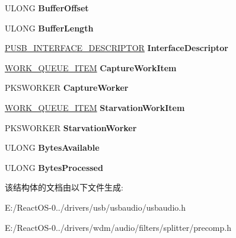 \begin{DoxyCompactItemize}
\item 
\mbox{\label{struct_p_i_n___c_o_n_t_e_x_t_a1b692865c2a3ac67ae30cae76ea9e280}} 
U\+L\+O\+NG {\bfseries Buffer\+Offset}
\item 
\mbox{\label{struct_p_i_n___c_o_n_t_e_x_t_a5e3c1354a0704eee10c434d832e787de}} 
U\+L\+O\+NG {\bfseries Buffer\+Length}
\item 
\mbox{\label{struct_p_i_n___c_o_n_t_e_x_t_ab3276f43d98ac39fb34ae56777789740}} 
\hyperlink{struct___u_s_b___i_n_t_e_r_f_a_c_e___d_e_s_c_r_i_p_t_o_r}{P\+U\+S\+B\+\_\+\+I\+N\+T\+E\+R\+F\+A\+C\+E\+\_\+\+D\+E\+S\+C\+R\+I\+P\+T\+OR} {\bfseries Interface\+Descriptor}
\item 
\mbox{\label{struct_p_i_n___c_o_n_t_e_x_t_a2c9e70437ab76c10b8f400f8b0b185e9}} 
\hyperlink{struct___w_o_r_k___q_u_e_u_e___i_t_e_m}{W\+O\+R\+K\+\_\+\+Q\+U\+E\+U\+E\+\_\+\+I\+T\+EM} {\bfseries Capture\+Work\+Item}
\item 
\mbox{\label{struct_p_i_n___c_o_n_t_e_x_t_a99a39eacd1c04b3d86d374338d24d163}} 
P\+K\+S\+W\+O\+R\+K\+ER {\bfseries Capture\+Worker}
\item 
\mbox{\label{struct_p_i_n___c_o_n_t_e_x_t_a0f9aa580d2534302154dbe66ec26dc80}} 
\hyperlink{struct___w_o_r_k___q_u_e_u_e___i_t_e_m}{W\+O\+R\+K\+\_\+\+Q\+U\+E\+U\+E\+\_\+\+I\+T\+EM} {\bfseries Starvation\+Work\+Item}
\item 
\mbox{\label{struct_p_i_n___c_o_n_t_e_x_t_a569eb25c5717d3027b57cd3d22cf6f64}} 
P\+K\+S\+W\+O\+R\+K\+ER {\bfseries Starvation\+Worker}
\item 
\mbox{\label{struct_p_i_n___c_o_n_t_e_x_t_a8e9e63e83408e10d88c80995051f11b7}} 
U\+L\+O\+NG {\bfseries Bytes\+Available}
\item 
\mbox{\label{struct_p_i_n___c_o_n_t_e_x_t_ad16e2329095df2b6505ca33a1f8471e0}} 
U\+L\+O\+NG {\bfseries Bytes\+Processed}
\end{DoxyCompactItemize}


该结构体的文档由以下文件生成\+:\begin{DoxyCompactItemize}
\item 
E\+:/\+React\+O\+S-\/0../drivers/usb/usbaudio/usbaudio.\+h\item 
E\+:/\+React\+O\+S-\/0../drivers/wdm/audio/filters/splitter/precomp.\+h\end{DoxyCompactItemize}
